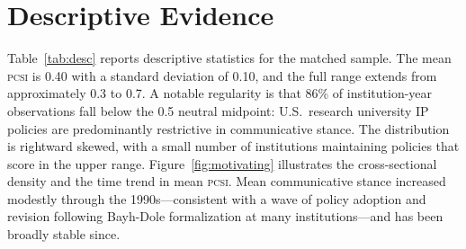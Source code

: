 \documentclass[12pt]{article}
\newcommand{\PCSI}{\textsc{pcsi}}
\begin{document}
\section{Descriptive Evidence}
\label{sec:descriptive}

Table~\ref{tab:desc} reports descriptive statistics for the matched sample. The mean
\PCSI{} is 0.40 with a standard deviation of 0.10, and the full range extends from
approximately 0.3 to 0.7. A notable regularity is that 86\% of institution-year
observations fall below the 0.5 neutral midpoint: U.S.\ research university IP policies
are predominantly restrictive in communicative stance. The distribution is rightward
skewed, with a small number of institutions maintaining policies that score in the
upper range. Figure~\ref{fig:motivating} illustrates the cross-sectional density and
the time trend in mean \PCSI{}. Mean communicative stance increased modestly through
the 1990s---consistent with a wave of policy adoption and revision following Bayh-Dole
formalization at many institutions---and has been broadly stable since.
\end{document}
